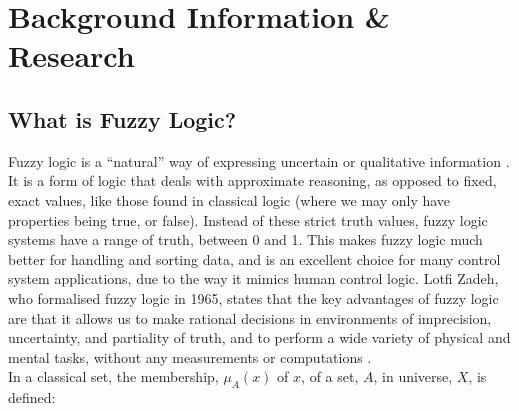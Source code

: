 \section{Background Information \& Research}

\subsection{What is Fuzzy Logic?}
Fuzzy logic is a ``natural'' way of expressing uncertain or qualitative information \cite{albertos1998fuzzy}. It is a form of logic that deals with approximate reasoning, as opposed to fixed, exact values, like those found in classical logic (where we may only have properties being true, or false). Instead of these strict truth values, fuzzy logic systems have a range of truth, between 0 and 1. This makes fuzzy logic much better for handling and sorting data, and is an excellent choice for many control system applications, due to the way it mimics human control logic. Lotfi Zadeh, who formalised fuzzy logic in 1965, states that the key advantages of fuzzy logic are that it allows us to make rational decisions in environments of imprecision, uncertainty, and partiality of truth, and to perform a wide variety of physical and mental tasks, without any measurements or computations \cite{zadeh1999computing}.\\[2mm]
\noindent 
In a classical set, the membership, $\mu_A(x)$ of $x$, of a set, $A$, in universe, $X$, is defined:

